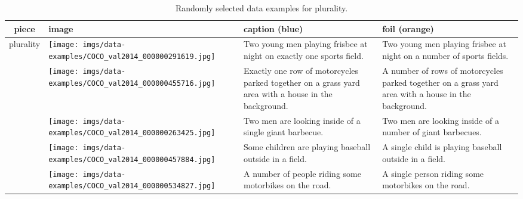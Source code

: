 \documentclass[11pt]{article}
\newcommand{\gr}[1]{\textcolor{niceblue}{#1}}
\newcommand\red[1]{\textcolor{niceorange}{#1}}
\begin{document}
\begin{table*}[t]
    \small
    \centering
    
\begin{tabular}{cp{.3\linewidth}b{.25\linewidth}b{.25\linewidth}}
      \toprule
    \bf piece & \bf image & \bf caption (\gr{blue}) & \bf foil (\red{orange}) \\
    \midrule
    \multirow{5}{*}{plurality} & \texttt{[image: imgs/data-examples/COCO\_val2014\_000000291619.jpg]}
      & Two young men playing frisbee at night on \gr{exactly one sports field}. & Two young men playing frisbee at night on \red{a number of sports fields}. \\
      \cmidrule{2-4}
      & \texttt{[image: imgs/data-examples/COCO\_val2014\_000000455716.jpg]}
      & \gr{Exactly one row} of motorcycles parked together on a grass yard area with a house in the background. & \red{A number of rows} of motorcycles parked together on a grass yard area with a house in the background. \\
      \cmidrule{2-4}
      & \texttt{[image: imgs/data-examples/COCO\_val2014\_000000263425.jpg]}
      & Two men are looking inside of \gr{a single giant barbecue}. & Two men are looking inside of \red{a number of giant barbecues}. \\
      \cmidrule{2-4}
      & \texttt{[image: imgs/data-examples/COCO\_val2014\_000000457884.jpg]}
      & \gr{Some children} are playing baseball outside in a field. & \red{A single child} is playing baseball outside in a field. \\
      \cmidrule{2-4}
    & \texttt{[image: imgs/data-examples/COCO\_val2014\_000000534827.jpg]}
      & \gr{A number of people} riding some motorbikes on the road. & \red{A single person} riding some motorbikes on the road. \\
      \bottomrule
    \end{tabular}
\caption{Randomly selected data examples for plurality.}
    \label{tab:plurality-examples}
\end{table*}
\end{document}
